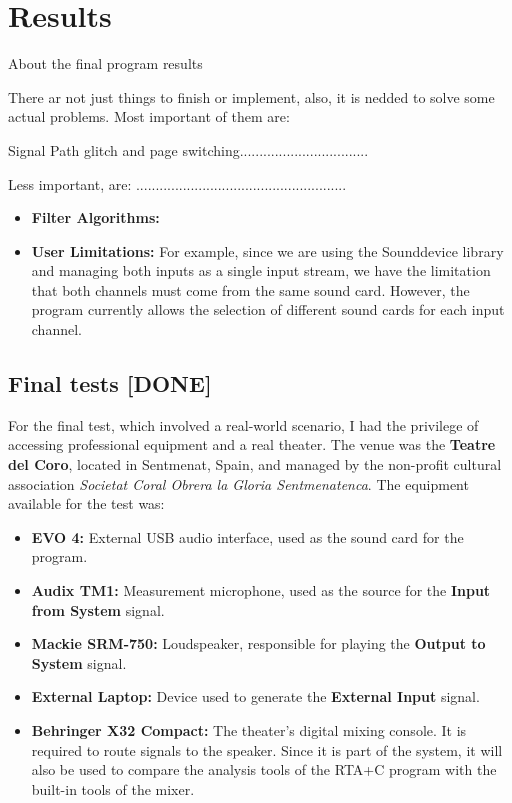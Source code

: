 \chapter{Results}

About the final program results

There ar not just things to finish or implement, also, it is nedded to solve some actual problems. Most important of them are:

Signal Path glitch and page switching.................................

Less important, are: ......................................................

\begin{itemize}
	\item \textbf{Filter Algorithms:}
	
	\item \textbf{User Limitations:} For example, since we are using the Sounddevice library and managing both inputs as a single input stream, we have the limitation that both channels must come from the same sound card. However, the program currently allows the selection of different sound cards for each input channel.
	
\end{itemize}

\section{Final tests [DONE]}

For the final test, which involved a real-world scenario, I had the privilege of accessing professional equipment and a real theater. The venue was the \textbf{Teatre del Coro}, located in Sentmenat, Spain, and managed by the non-profit cultural association \textit{Societat Coral Obrera la Gloria Sentmenatenca}. The equipment available for the test was:

\begin{itemize}
	\item \textbf{EVO 4:} External USB audio interface, used as the sound card for the program.
	\item \textbf{Audix TM1:} Measurement microphone, used as the source for the \textbf{Input from System} signal.
	\item \textbf{Mackie SRM-750:} Loudspeaker, responsible for playing the \textbf{Output to System} signal.
	\item \textbf{External Laptop:} Device used to generate the \textbf{External Input} signal.
	\item \textbf{Behringer X32 Compact:} The theater's digital mixing console. It is required to route signals to the speaker. Since it is part of the system, it will also be used to compare the analysis tools of the RTA+C program with the built-in tools of the mixer.
\end{itemize}

